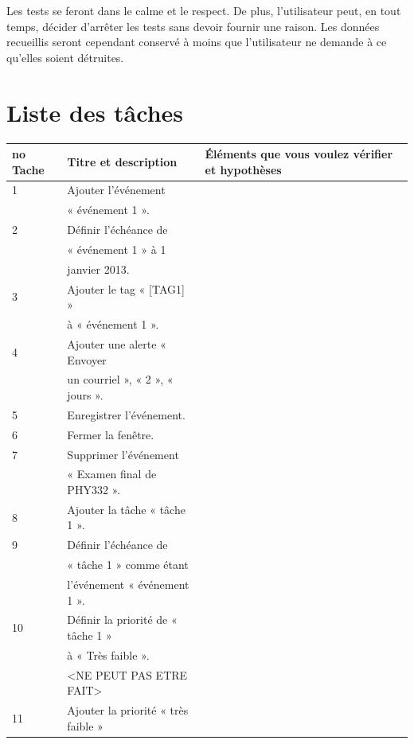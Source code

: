 \documentclass[letterpaper, oneside, 12pt, these, creativecommons]{thETS}
\begin{document}
Les tests se feront dans le calme et le respect. De plus, l'utilisateur peut, en tout temps, décider d'arrêter les tests sans devoir fournir une raison. Les données recueillis seront cependant conservé à moins que l'utilisateur ne demande à ce qu'elles soient détruites.

\newpage

\section{Liste des tâches}

\begin{table}
	\centering
	\begin{tabular}{|l|l|l|}
		\hline
		no Tache	& Titre et description		& Éléments que vous voulez vérifier et hypothèses 	\\ \hline 
		1		& Ajouter l'événement 		&  							\\ 
				& « événement 1 ».			&							\\ \hline
		2		& Définir l’échéance de 		&							\\
				& « événement 1 » à 1 		&							\\
				& janvier 2013.			&							\\ \hline
		3		& Ajouter le tag « [TAG1] » 	&							\\
				& à « événement 1 ».		&							\\ \hline
		4		& Ajouter une alerte « Envoyer 	&							\\
				& un courriel », « 2 », « jours ».	&							\\ \hline
		5		& Enregistrer l’événement.	& 							\\ \hline
		6		& Fermer la fenêtre.		&							\\ \hline
		7		& Supprimer l’événement		&							\\
				&  « Examen final de PHY332 ».	& 							\\ \hline
		8		& Ajouter la tâche « tâche 1 ». 	&							\\ \hline
		9		& Définir l’échéance de  		&							\\
				& « tâche 1 » comme étant	&							\\
				&  l’événement « événement 1 ».	&							\\ \hline
		10		& Définir la priorité de  « tâche 1 »&							\\
				&  à « Très faible ». 		&							\\
				& <NE PEUT PAS ETRE FAIT>	&							\\ \hline
		11		& Ajouter la priorité « très faible »&							\\

\end{tabular}
\end{table}
\end{document}
